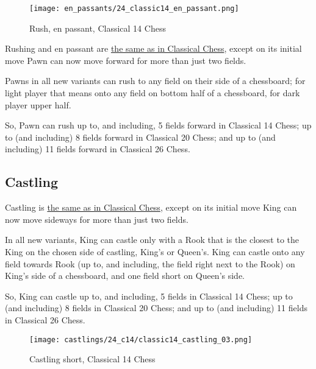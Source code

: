 \noindent
\begin{wrapfigure}{l}{0.4\textwidth}
\centering
\texttt{[image: en\_passants/24\_classic14\_en\_passant.png]}
\caption{Rush, en passant, Classical 14 Chess}
\label{fig:24_classic14_en_passant}
\end{wrapfigure}
Rushing and en passant are
\href{https://en.wikipedia.org/wiki/En\_passant}{the same as in Classical Chess},
except on its initial move Pawn can now move forward for more than just two
fields.

Pawns in all new variants can rush to any field on their side of a chessboard;
for light player that means onto any field on bottom half of a chessboard, for
dark player upper half.

So, Pawn can rush up to, and including, 5 fields forward in Classical 14 Chess;
up to (and including) 8 fields forward in Classical 20 Chess; and up to (and
including) 11 fields forward in Classical 26 Chess.

\vfill{}

\clearpage %

\subsection*{Castling}
\label{sec:Simple variants/Classical Chess variants/Castling}

Castling is
\href{https://en.wikipedia.org/wiki/Castling}{the same as in Classical Chess},
except on its initial move King can now move sideways for more than just two
fields.

In all new variants, King can castle only with a Rook that is the closest to the
King on the chosen side of castling, King's or Queen's. King can castle onto any
field towards Rook (up to, and including, the field right next to the Rook) on
King's side of a chessboard, and one field short on Queen's side.

So, King can castle up to, and including, 5 fields in Classical 14 Chess;
up to (and including) 8 fields in Classical 20 Chess; and up to (and
including) 11 fields in Classical 26 Chess.

\noindent
\begin{figure}[!h]
\texttt{[image: castlings/24\_c14/classic14\_castling\_03.png]}
\vspace*{-1.4\baselineskip}
\caption{Castling short, Classical 14 Chess}
\label{fig:classic14_castling_03}
\end{figure}

